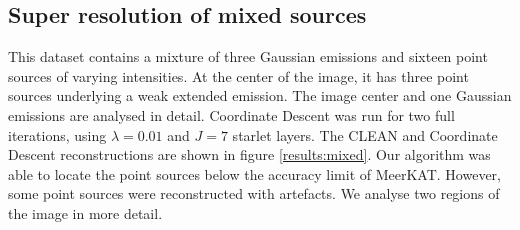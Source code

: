 \subsection{Super resolution of mixed sources}
This dataset contains a mixture of three Gaussian emissions and sixteen point sources of varying intensities. At the center of the image, it has three point sources underlying a weak extended emission. The image center and one Gaussian emissions are analysed in detail. Coordinate Descent was run for two full iterations, using  $\lambda=0.01$ and $J=7$ starlet layers. The CLEAN and Coordinate Descent reconstructions are shown in figure \ref{results:mixed}. Our algorithm was able to locate the point sources below the accuracy limit of MeerKAT. However, some point sources were reconstructed with artefacts. We analyse two regions of the image in more detail.

